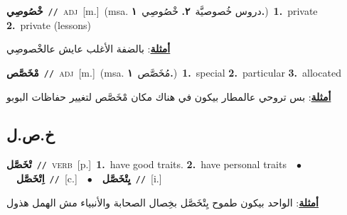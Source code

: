 \documentclass[10pt,a4paper,twoside]{article} %
\begin{document}
\begin{multicols}{2}
{\setlength\topsep{0pt}\textbf{\foreignlanguage{arabic}{خْصُوصِي}}\ {\color{gray}\texttt{//}\color{black}}\ \textsc{adj}\ [m.]\ \color{gray}(msa. \foreignlanguage{arabic}{دروس خُصوصيَّة}~\foreignlanguage{arabic}{\textbf{٢.}}  \foreignlanguage{arabic}{خْصُوصِي}~\foreignlanguage{arabic}{\textbf{١.}})\color{black}\ \textbf{1.}~private  \textbf{2.}~private (lessons)\  \begin{flushright}\color{gray}\foreignlanguage{arabic}{\textbf{\underline{\foreignlanguage{arabic}{أمثلة}}}: بالضفة الأغلب عايش عالخْصوصِي}\end{flushright}\color{black}} \vspace{2mm}

{\setlength\topsep{0pt}\textbf{\foreignlanguage{arabic}{مْخَصَّص}}\ {\color{gray}\texttt{//}\color{black}}\ \textsc{adj}\ [m.]\ \color{gray}(msa. \foreignlanguage{arabic}{مُخَصَّص}~\foreignlanguage{arabic}{\textbf{١.}})\color{black}\ \textbf{1.}~special  \textbf{2.}~particular  \textbf{3.}~allocated\  \begin{flushright}\color{gray}\foreignlanguage{arabic}{\textbf{\underline{\foreignlanguage{arabic}{أمثلة}}}: بس تروحي عالمطار بيكون في هناك مكان مْخَصَّص لتغيير حفاظات البوبو}\end{flushright}\color{black}} \vspace{2mm}

\vspace{-3mm}
\subsection*{\color{blue}\foreignlanguage{arabic}{خ.ص.ل}\color{blue}{}} 

{\setlength\topsep{0pt}\textbf{\foreignlanguage{arabic}{تْخَصَّل}}\ {\color{gray}\texttt{//}\color{black}}\ \textsc{verb}\ [p.]\ \textbf{1.}~have good traits.  \textbf{2.}~have personal traits\ \ $\bullet$\ \ \setlength\topsep{0pt}\textbf{\foreignlanguage{arabic}{اِتْخَصَّل}}\ {\color{gray}\texttt{//}\color{black}}\ [c.]\ \ $\bullet$\ \ \setlength\topsep{0pt}\textbf{\foreignlanguage{arabic}{يِتْخَصَّل}}\ {\color{gray}\texttt{//}\color{black}}\ [i.]\  \begin{flushright}\color{gray}\foreignlanguage{arabic}{\textbf{\underline{\foreignlanguage{arabic}{أمثلة}}}: الواحد بيكون طموح يِتْخَصَّل بخِصال الصحابة والأنبياء مش الهمل هذول}\end{flushright}\color{black}} \vspace{2mm}


\end{multicols}
\end{document}
